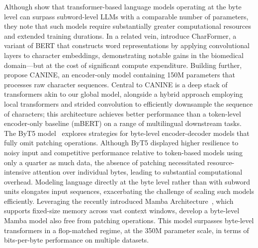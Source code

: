 Although \cite{Choe2019BridgingTG} show that transformer-based language models operating at the byte level can surpass subword-level LLMs with a comparable number of parameters, they note that such models require substantially greater computational resources and extended training durations. In a related vein, \cite{el2020characterbert} introduce CharFormer, a variant of BERT that constructs word representations by applying convolutional layers to character embeddings, demonstrating notable gains in the biomedical domain—but at the cost of significant compute expenditure. Building further, \cite{clark2022canine} propose CANINE, an encoder-only model containing 150M parameters that processes raw character sequences. Central to CANINE is a deep stack of transformers akin to our global model, alongside a hybrid approach employing local transformers and strided convolution to efficiently downsample the sequence of characters; this architecture achieves better performance than a token-level encoder-only baseline (mBERT) on a range of multilingual downstream tasks. The ByT5 model~\citep{xue2022byt5} explores strategies for byte-level encoder-decoder models that fully omit patching operations. Although ByT5 displayed higher resilience to noisy input and competitive performance relative to token-based models using only a quarter as much data, the absence of patching necessitated resource-intensive attention over individual bytes, leading to substantial computational overhead. Modeling language directly at the byte level rather than with subword units elongates input sequences, exacerbating the challenge of scaling such models efficiently. Leveraging the recently introduced Mamba Architecture~\citep{gu2023mamba}, which supports fixed-size memory across vast context windows, \cite{wang2024mambabyte} develop a byte-level Mamba model also free from patching operations. This model surpasses byte-level transformers in a flop-matched regime, at the 350M parameter scale, in terms of bits-per-byte performance on multiple datasets.


